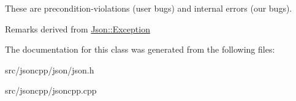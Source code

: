 These are precondition-\/violations (user bugs) and internal errors (our bugs).

\begin{DoxyRemark}{Remarks}
derived from \hyperlink{classJson_1_1Exception}{Json\+::\+Exception} 
\end{DoxyRemark}


The documentation for this class was generated from the following files\+:\begin{DoxyCompactItemize}
\item 
src/jsoncpp/json/json.\+h\item 
src/jsoncpp/jsoncpp.\+cpp\end{DoxyCompactItemize}
